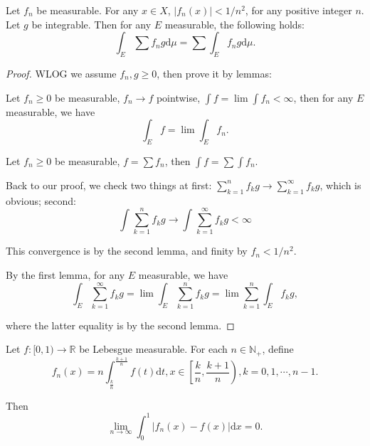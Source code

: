 \begin{problem}
Let $ f_{n} $ be measurable. For any $ x\in X $, $ |f_{n}(x)|<1/n^{2} $, for any positive integer $ n $. Let $ g $ be integrable. Then for any $ E $ measurable, the following holds:
$$
	\int_E{\sum{f_ng}\mathrm{d} \mu}=\sum\int_E{f_ng}\mathrm{d} \mu.
$$

\end{problem}

\begin{proof}
	WLOG we assume $ f_{n},g\ge0 $, then prove it by lemmas:

	\begin{lemma*}
		Let $ f_{n}\ge 0 $ be measurable, $ f_{n}\to f $ pointwise, $ \int f=\lim \int f_{n}<\infty $, then for any $ E $ measurable, we have
		$$
			\int_E{f}=\lim \int_E{f_n}.
		$$
	\end{lemma*}

	\begin{lemma*}
		Let $ f_{n}\ge 0 $ be measurable, $ f=\sum f_{n} $, then $ \int f=\sum \int f_{n} $.
	\end{lemma*}

	Back to our proof, we check two things at first:  $
		\sum_{k=1}^n{f_kg}\rightarrow \sum_{k=1}^{\infty}{f_kg}
	$, which is obvious; second:
	$$
		\int_{}^{}{\sum_{k=1}^n{f_kg}}\rightarrow \int_{}^{}{\sum_{k=1}^{\infty}{f_kg}}<\infty
	$$

	This convergence is by the second lemma, and finity by $ f_{n}<1/n^{2} $.

	By the first lemma, for any $ E $ measurable, we have
	$$
		\int_E^{}{\sum_{k=1}^{\infty}{f_kg}}=\lim \int_E^{}{\sum_{k=1}^n{f_kg}}=\lim \sum_{k=1}^n{\int_E^{}{f_kg}},
	$$

	where the latter equality is by the second lemma.
\end{proof}

\begin{problem}
Let $ f\colon[ 0,1)\to \mathbb{R}   $ be Lebesgue measurable. For each $ n\in \mathbb{N} _{+} $, define
$$
	f_n( x ) =n\int_{\frac{k}{n}}^{\frac{k+1}{n}}{f( t ) \mathrm{d} t},x\in \left[ \frac{k}{n},\frac{k+1}{n} \right) ,k=0,1,\cdots ,n-1.
$$

Then$$
	\lim_{n\rightarrow \infty}\int_0^1{|f_n( x ) -f( x ) |\mathrm{d} x}=0.
$$
\end{problem}


